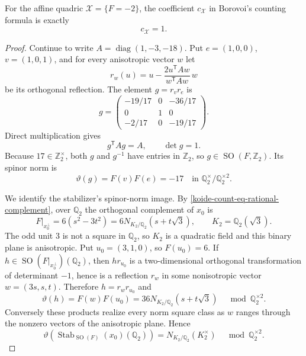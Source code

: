 \begin{proposition}
\label{koide-count-prop-finite-sign-balance}
For the affine quadric \(\mathscr X=\{F=-2\}\), the coefficient
\(c_{\mathscr X}\) in Borovoi's counting formula
\cite[Theorem~1.4.1 and Proposition~1.5.1]{Borovoi_2001} is exactly
\begin{equation}
 c_{\mathscr X}=1.
 \label{koide-count-eq-borovoi-coefficient}
\end{equation}
\end{proposition}

\begin{proof}
Continue to write \(A=\operatorname{diag}(1,-3,-18)\).  Put
\(e=(1,0,0)\), \(v=(1,0,1)\), and for every anisotropic vector \(w\) let
\[
 r_w(u)=u-\frac{2u^{\mathsf T}Aw}{w^{\mathsf T}Aw}\,w
\]
be its orthogonal reflection.  The element \(g=r_vr_e\) is
\begin{equation}
 g=
 \begin{pmatrix}
  -19/17&0&-36/17\\
  0&1&0\\
  -2/17&0&-19/17
 \end{pmatrix}.
 \label{koide-count-eq-sign-toggle-matrix}
\end{equation}
Direct multiplication gives
\begin{equation}
 g^{\mathsf T}Ag=A,
 \qquad
 \det g=1.
 \label{koide-count-eq-sign-toggle-orthogonal}
\end{equation}
Because \(17\in\mathbb Z_2^\times\), both \(g\) and \(g^{-1}\) have entries
in \(\mathbb Z_2\), so \(g\in\operatorname{SO}(F,\mathbb Z_2)\).  Its
spinor norm is
\begin{equation}
 \vartheta(g)=F(v)F(e)=-17
 \quad\text{in }\mathbb Q_2^\times/\mathbb Q_2^{\times2}.
 \label{koide-count-eq-toggle-spinor-norm}
\end{equation}

We identify the stabilizer's spinor-norm image.  By
\eqref{koide-count-eq-rational-complement}, over \(\mathbb Q_2\) the
orthogonal complement of \(x_0\) is
\begin{equation}
 F|_{x_0^\perp}
 =6(s^2-3t^2)
 =6N_{K_2/\mathbb Q_2}(s+t\sqrt3),
 \qquad K_2=\mathbb Q_2(\sqrt3).
 \label{koide-count-eq-two-adic-complement}
\end{equation}
The odd unit \(3\) is not a square in \(\mathbb Q_2\), so \(K_2\) is a
quadratic field and this binary plane is anisotropic.  Put
\(u_0=(3,1,0)\), so \(F(u_0)=6\).  If
\(h\in\operatorname{SO}(F|_{x_0^\perp})(\mathbb Q_2)\), then
\(hr_{u_0}\) is a two-dimensional orthogonal transformation of determinant
\(-1\), hence is a reflection \(r_w\) in some nonisotropic vector
\(w=(3s,s,t)\).  Therefore \(h=r_wr_{u_0}\) and
\[
 \vartheta(h)=F(w)F(u_0)
 =36N_{K_2/\mathbb Q_2}(s+t\sqrt3)
 \quad\bmod\mathbb Q_2^{\times2}.
\]
Conversely these products realize every norm square class as \(w\) ranges
through the nonzero vectors of the anisotropic plane.  Hence
\begin{equation}
 \vartheta\!\left(
 \operatorname{Stab}_{\operatorname{SO}(F)}(x_0)(\mathbb Q_2)
 \right)
 =N_{K_2/\mathbb Q_2}(K_2^\times)
 \quad\bmod\mathbb Q_2^{\times2}.
 \label{koide-count-eq-stabilizer-spinor-image}
\end{equation}


\end{proof}
